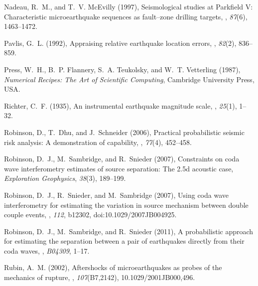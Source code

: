 \documentclass[12pt,double]{article}
\begin{document}
\begin{thebibliography}{45}
Nadeau, R.~M., and T.~V. Mc{E}villy (1997), Seismological studies at
  {P}arkfield {V}: {C}haracteristic microearthquake sequences as fault--zone
  drilling targets, \bssa,
  \textit{87}(6), 1463--1472.

Pavlis, G.~L. (1992), Appraising relative earthquake location errors,
  \bssa, \textit{82}(2),
  836--859.

Press, W.~H., B.~P. Flannery, S.~A. Teukolsky, and W.~T. Vetterling (1987),
  \textit{Numerical Recipes: The Art of Scientific Computing}, Cambridge
  University Press, USA.

Richter, C.~F. (1935), An instrumental earthquake magnitude scale,
  \bssa, \textit{25}(1),
  1--32.

Robinson, D., T.~Dhu, and J.~Schneider (2006), Practical probabilistic seismic
  risk analysis: {A} demonstration of capability, \srl, \textit{77}(4), 452--458.

Robinson, D.~J., M.~Sambridge, and R.~Snieder (2007{}), Constraints
  on coda wave interferometry estimates of source separation: The 2.5d acoustic
  case, \textit{Exploration Geophysics}, \textit{38}(3), 189--199.

Robinson, D.~J., R.~Snieder, and M.~Sambridge (2007{}), Using coda
  wave interferometry for estimating the variation in source mechanism between
  double couple events, \jgr, \textit{112},
  b12302, doi:10.1029/2007JB004925.

Robinson, D.~J., M.~Sambridge, and R.~Snieder (2011), A probabilistic approach
  for estimating the separation between a pair of earthquakes directly from
  their coda waves, \jgr, \textit{B04309},
  1--17.

Rubin, A.~M. (2002), Aftershocks of microearthquakes as probes of the mechanics
  of rupture, \jgr, \textit{107}(B7,2142),
  10.1029/2001JB000,496.


\end{thebibliography}
\end{document}
